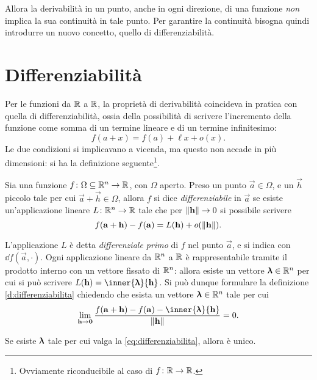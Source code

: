 Allora la derivabilità in un punto, anche in ogni direzione, di una funzione \emph{non} implica la sua continuità in tale punto. Per garantire la continuità bisogna quindi introdurre un nuovo concetto, quello di differenziabilità.

\section{Differenziabilità}
Per le funzioni da $\mathbb{R}$ a $\mathbb{R}$, la proprietà di derivabilità coincideva in pratica con quella di differenziabilità, ossia della possibilità di scrivere l'incremento della funzione come somma di un termine lineare e di un termine infinitesimo:
\[
f(a+x)=f(a)+\ell x+o(x).
\]
Le due condizioni si implicavano a vicenda, ma questo non accade in più dimensioni: si ha la definizione seguente\footnote{Ovviamente riconducibile al caso di $f\colon\mathbb{R}\to\mathbb{R}$.}.
\begin{definizione} \label{d:differenziabilita}
Sia una funzione $f\colon\Omega\subseteq\mathbb{R}^n\to\mathbb{R}$, con $\Omega$ aperto. Preso un punto $\vec a\in\Omega$, e un $\vec h$ piccolo tale per cui $\vec a+\vec h\in\Omega$, allora $f$ si dice \emph{differenziabile} in $\vec a$ se esiste un'applicazione lineare $L\colon\mathbb{R}^n\to\mathbb{R}$ tale che per $\lVert\mathbf{h}\rVert\to 0$ si possibile scrivere
\begin{equation} \label{eq:differenziabilita-app}
f(\mathbf{a}+\mathbf{h})-f(\mathbf{a})=L(\mathbf{h})+o(\lVert\mathbf{h}\rVert).
\end{equation}
\end{definizione}
L'applicazione $L$ è detta \emph{differenziale primo} di $f$ nel punto $\vec a$, e si indica con $\dd f(\vec a,\cdot)$.
Ogni applicazione lineare da $\mathbb{R}^n$ a $\mathbb{R}$ è rappresentabile %
tramite il prodotto interno con un vettore fissato di $\mathbb{R}^n$: allora esiste un vettore $\bm{\uplambda}\in\mathbb{R}^n$ per cui si può scrivere $L(\vec h)=\inner{\vlambda}{\vec h}$. Si può dunque formulare la definizione \ref{d:differenziabilita} chiedendo che esista un vettore $\bm{\uplambda}\in\mathbb{R}^n$ tale per cui
\begin{equation} \label{eq:differenziabilita}
\lim_{\vec h\to\vec 0}\frac{f(\vec a+\vec h)-f(\vec a)-\inner{\vlambda}{\vec h}}{\norm{\vec h}}=0.
\end{equation}
\begin{osservazione}
Se esiste $\bm{\uplambda}$ tale per cui valga la \eqref{eq:differenziabilita}, allora è unico.
\end{osservazione}
